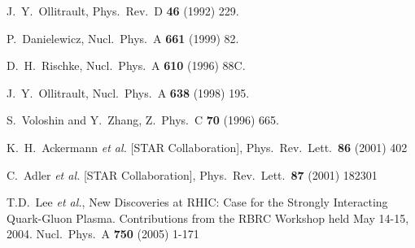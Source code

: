\documentclass[a4paper]{book}
\numberwithin{equation}{subsection}
\begin{document}
	\begin{thebibliography}{99}
				
				  
		J.~Y.~Ollitrault,
		Phys.\ Rev.\ D {\bf 46} (1992) 229.
				
		P.~Danielewicz,
		Nucl.\ Phys.\ A {\bf 661} (1999) 82.
				
		D.~H.~Rischke,
		Nucl.\ Phys.\ A {\bf 610} (1996) 88C.
				
		J.~Y.~Ollitrault,
		Nucl.\ Phys.\ A {\bf 638} (1998) 195.
				
		S.~Voloshin and Y.~Zhang,
		Z.\ Phys.\ C {\bf 70} (1996) 665.
				
		K.~H.~Ackermann {\it et al.}  [STAR Collaboration],
		Phys.\ Rev.\ Lett.\  {\bf 86} (2001) 402
				  
		C.~Adler {\it et al.}  [STAR Collaboration],
		Phys.\ Rev.\ Lett.\  {\bf 87} (2001) 182301  
				
		T.D.~Lee {\it et al.}, 
		New Discoveries at RHIC: Case for the Strongly Interacting 
		Quark-Gluon Plasma. 
		Contributions from the RBRC Workshop held May 14-15, 2004.
		Nucl.\ Phys.\ A {\bf 750} (2005) 1-171
				
				    
	\end{thebibliography}
		
	\printindex
\end{document}
